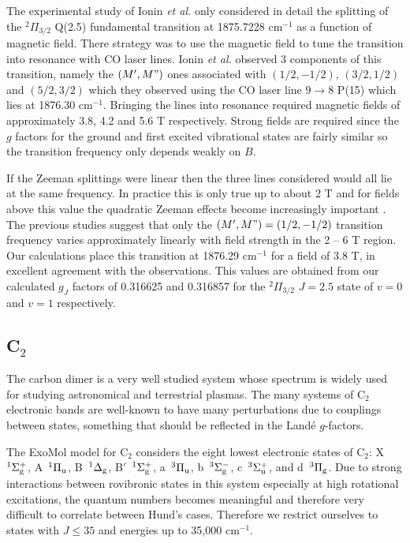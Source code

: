 \documentclass[preprint,review,12pt]{elsarticle}
\newcommand{\2}{$_{2}$}
\newcommand{\3}{$_{3}$}
\newcommand{\4}{$_{4}$}
\newcommand{\8}{$^{18}$}
\newcommand{\6}{$^{16}$}
\newcommand{\7}{$^{17}$}
\newcommand{\cm}{cm$^{-1}$}
\def\Xstate{{X~$^{1}\Sigma_{\rm g}^{+}$}}
\def\Astate{{A~$^{1}\Pi_{\rm u}$}}
\def\Bstate{{B~$^{1}\Delta_{\rm g}$}}
\def\astate{{a~$^{3}\Pi_{\rm u}$}}
\def\bstate{{b~$^{3}\Sigma_{\rm g}^{-}$}}
\def\cstate{{c~$^{3}\Sigma_{\rm u}^{+}$}}
\def\dstate{{d~$^{3}\Pi_{\rm g}$}}
\begin{document}
The experimental study of Ionin {\it et al.} \cite{11IoKlKo.NO} only
considered in detail the splitting of the $^2\Pi_{3/2}$ Q(2.5)
fundamental transition at 1875.7228 cm$^{-1}$ as a function of
magnetic field. There strategy was to use the magnetic field to tune
the transition into resonance with CO laser lines.  Ionin {\it et al.}
observed 3 components of this transition, namely the $(M',M")$ ones
associated with $({1}/{2},-{1}/{2})$, $({3}/{2},{1}/{2})$
and  $({5}/{2},{3}/{2})$ which they observed using the CO
laser line $9 \rightarrow 8$ P(15) which lies at 1876.30  cm$^{-1}$.
Bringing the lines into resonance required magnetic fields of
approximately 3.8, 4.2 and 5.6 T respectively. Strong fields
are required since the $g$ factors for the ground and first excited
vibrational states are fairly similar so the transition frequency
only depends weakly on $B$.

If the Zeeman splittings were linear then the three lines considered
would all lie at the same frequency.  In practice this is only true up
to about 2 T  and for fields above this value
the quadratic Zeeman effects become increasingly important
\cite{11IoKlKo.NO,16BoSuKl.NO}. The previous studies suggest that
 only the $(M',M") =
({1}/{2},-{1}/{2})$ transition frequency varies approximately
linearly with field strength in the 2 -- 6 T region.
Our calculations place this transition at 1876.29 cm$^{-1}$ for
a field of 3.8 T, in excellent agreement with the observations.
This values are obtained from our calculated $g_J$ factors
of 0.316625 and 0.316857 for the $^2\Pi_{3/2}$ $J=2.5$ state of $v=0$ and $v=1$ respectively.


\subsection{C$_2$}

The carbon dimer is a very well studied system 	\cite{jt637,92Martin} whose
spectrum is widely used for studying astronomical and terrestrial plasmas.
The many systems  of C$_2$ electronic bands are well-known to have many
perturbations due to couplings between states, something that should
be reflected in the Land\'e $g$-factors.

The ExoMol model for C$_2$ considers the eight lowest electronic states
of C$_2$: \Xstate, \Astate, \Bstate, B$'$~$^{1}\Sigma_{\rm g}^+$,
\astate, \bstate, \cstate, and \dstate.
Due to strong interactions between rovibronic states in this system especially at high rotational excitations, the
quantum numbers becomes meaningful and therefore very difficult to correlate between Hund's cases. Therefore we
restrict ourselves to states with $J \leq 35$ and energies up to 35,000 \cm.
\end{document}
